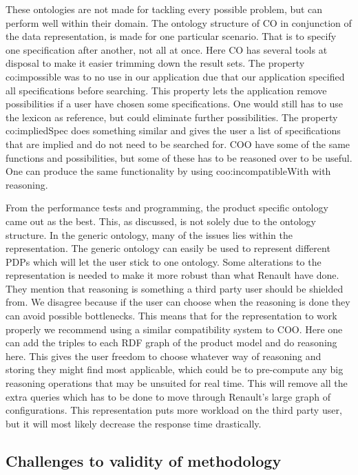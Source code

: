 \documentclass{llncs}
\begin{document}
These ontologies are not made for tackling every possible
problem, but can perform well within their domain. The ontology
structure of CO in conjunction of the data representation, is made for
one particular scenario. That is to specify one specification after
another, not all at once. Here CO has several tools at disposal to
make it easier trimming down the result sets. The property
\textsf{co:impossible} was to no use in our application due that our
application specified all specifications before searching. This
property lets the application remove possibilities if a user have
chosen some specifications. One would still has to use the lexicon as
reference, but could eliminate further possibilities. The property
\textsf{co:impliedSpec} does something similar and gives the user a
list of specifications that are implied and do not need to be searched
for.  COO have some of the same functions and possibilities, but some
of these has to be reasoned over to be useful. One can produce the
same functionality by using \textsf{coo:incompatibleWith} with
reasoning.

From the performance tests and programming, the product specific
ontology came out as the best.  This, as discussed, is not solely due
to the ontology structure. In the generic ontology, many of the issues
lies within the representation.  The generic ontology can easily be
used to represent different PDPs which will let the user stick to one
ontology.  Some alterations to the representation is needed to make it
more robust than what Renault have done.  They mention that reasoning
is something a third party user should be shielded from. We disagree
because if the user can choose when the reasoning is done they can
avoid possible bottlenecks. This means that for the representation to
work properly we recommend using a similar compatibility system to
COO. Here one can add the triples to each RDF graph of the product
model and do reasoning here. This gives the user freedom to choose
whatever way of reasoning and storing they might find most applicable,
which could be to pre-compute any big reasoning operations that may be
unsuited for real time. This will remove all the extra queries which
has to be done to move through Renault's large graph of
configurations. This representation puts more workload on the third
party user, but it will most likely decrease the response time
drastically.

\subsection{Challenges to validity of methodology}
\end{document}
